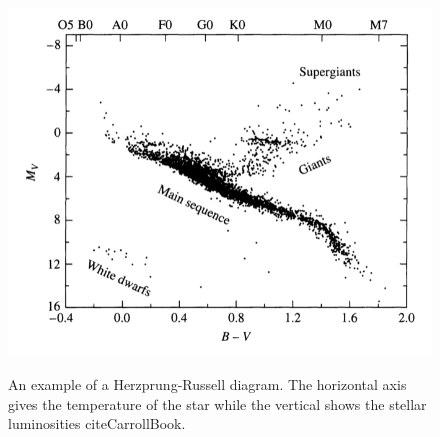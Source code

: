 \begin{figure}
\includegraphics[width=\linewidth]{figures/hrDiagram.png}
\label{fig: HR_diagram}
\caption{An example of a Herzprung-Russell diagram. The horizontal axis gives the temperature of the star while the vertical shows the stellar luminosities cite{CarrollBook}.}
\end{figure}

